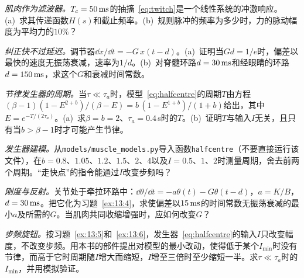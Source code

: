\begin{exercise}[\lvlB]
\label{ex:13:3}
\emph{肌肉作为滤波器。}$T_c=50\,\text{ms}$的抽搐~\eqref{eq:twitch}是一个线性系统的冲激响应。(a)~求其传递函数$H(s)$和截止频率。(b)~规则脉冲的频率为多少时，力的脉动幅度为平均力的$10\%$？
\end{exercise}

\begin{exercise}[\lvlB]
\label{ex:13:4}
\emph{纠正快不过延迟。}调节器$\dd x/\dd t=-G\,x(t-d)$。(a)~证明当$Gd=1/e$时，偏差以最快的速度无振荡衰减，速率为$1/d$。(b)~对脊髓环路$d=30\,\text{ms}$和经眼睛的环路$d=150\,\text{ms}$，求这个$G$和衰减时间常数。
\end{exercise}

\begin{exercise}[\lvlB]
\label{ex:13:5}
\emph{节律发生器的周期。}当$\tau\ll\tau_a$时，模型~\eqref{eq:halfcentre}的周期$T$由方程$(\beta-1)(1-E^{2+b})/(\beta-E)=b\,(1-E^{1+b})/(1+b)$给出，其中$E=e^{-T/(2\tau_a)}$。(a)~求$\beta=b=2$、$\tau_a=0.4$\,s时的$T$。(b)~证明$T$与输入$I$无关，且只有当$b>\beta-1$时才可能产生节律。
\end{exercise}

\begin{exercise}[\lvlB]
\label{ex:13:6}
\emph{发生器建模。}从\texttt{models/\allowbreak muscle\_models.py}导入函数\texttt{halfcentre}（不要直接运行该文件），在$b=0.8$、$1.05$、$1.2$、$1.5$、$2$、$4$以及$I=0.5$、$1$、$2$时测量周期，舍去前两个周期。“走快点”的指令能通过$I$改变步频吗？
\end{exercise}

\begin{exercise}[\lvlB]
\label{ex:13:7}
\emph{刚度与反射。}关节处于牵拉环路中：$\dd\theta/\dd t=-a\theta(t)-G\theta(t-d)$，$a=K/B$，$d=30\,\text{ms}$。把它化为习题~\ref{ex:13:4}，求使偏差以$15\,\text{ms}$的时间常数无振荡衰减的最小$a$及所需的$G$。当肌肉共同收缩增强时，应如何改变$G$？
\end{exercise}

\begin{exercise}[\lvlC]
\label{ex:13:8}
\emph{步频旋钮。}按习题~\ref{ex:13:5}和~\ref{ex:13:6}，发生器~\eqref{eq:halfcentre}的输入$I$只改变幅度，不改变步频。用本书的部件提出对模型的最小改动，使得低于某个$I_{\min}$时没有节律，而高于它时周期随$I$增大而缩短，$I$增至三倍时至少缩短一半。求$\tau\ll\tau_a$时的$I_{\min}$，并用模拟验证。
\end{exercise}
